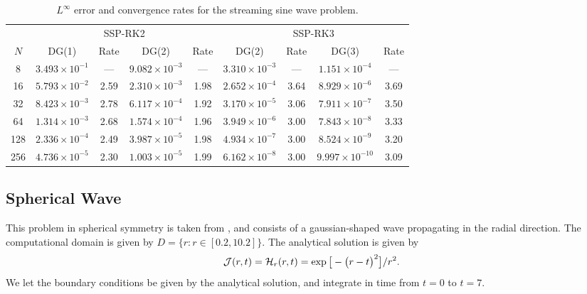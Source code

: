 \documentclass[10pt,preprint]{aastex}
\begin{document}
\begin{table}
  \begin{center}
  \caption{$L^{\infty}$ error and convergence rates for the streaming sine wave problem.}
  \label{tab:streamingSineWave}
  \begin{tabular}{ccccccccc}
    & \multicolumn{4}{c}{SSP-RK2} & \multicolumn{4}{c}{SSP-RK3} \\
    \cmidrule(r){2-5} \cmidrule(r){6-9}
    $N$ & DG(1) & Rate & DG(2) & Rate & DG(2) & Rate & DG(3) & Rate \\
    \midrule \midrule
    8     & $3.493\times10^{-1}$ & ---  & $9.082\times10^{-3}$ & ---  & $3.310\times10^{-3}$ & ---  & $1.151\times10^{-4}$  & --- \\
    16   & $5.793\times10^{-2}$ &2.59& $2.310\times10^{-3}$ &1.98& $2.652\times10^{-4}$ &3.64& $8.929\times10^{-6}$ &3.69 \\
    32   & $8.423\times10^{-3}$ &2.78& $6.117\times10^{-4}$ &1.92& $3.170\times10^{-5}$ &3.06& $7.911\times10^{-7}$ &3.50 \\
    64   & $1.314\times10^{-3}$ &2.68& $1.574\times10^{-4}$ &1.96& $3.949\times10^{-6}$ &3.00& $7.843\times10^{-8}$ &3.33 \\
    128 & $2.336\times10^{-4}$ &2.49& $3.987\times10^{-5}$ &1.98& $4.934\times10^{-7}$ &3.00& $8.524\times10^{-9}$ &3.20 \\
    256 & $4.736\times10^{-5}$ &2.30& $1.003\times10^{-5}$ &1.99& $6.162\times10^{-8}$ &3.00& $9.997\times10^{-10}$ &3.09 \\
    \midrule \midrule
  \end{tabular}
  \end{center}
\end{table}

\subsection{Spherical Wave}

This problem in spherical symmetry is taken from \citet{pons_etal_2000}, and consists of a gaussian-shaped wave propagating in the radial direction.  
The computational domain is given by $D=\{r:r\in[0.2,10.2]\}$.  
The analytical solution is given by
\begin{equation}
  \mathcal{J}(r,t)=\mathcal{H}_{r}(r,t)
  =\exp\big[-\big(r-t\big)^{2}\big]/r^{2}.  
\end{equation}
We let the boundary conditions be given by the analytical solution, and integrate in time from $t=0$ to $t=7$.  
\end{document}
